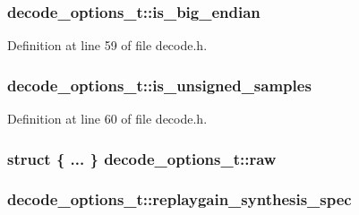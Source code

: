\subsubsection[{\texorpdfstring{is\+\_\+big\+\_\+endian}{is_big_endian}}]{ decode\+\_\+options\+\_\+t\+::is\+\_\+big\+\_\+endian}\hypertarget{structdecode__options__t_a7fc1291d097d6ccc9019b7ad43c47473}{}\label{structdecode__options__t_a7fc1291d097d6ccc9019b7ad43c47473}


Definition at line 59 of file decode.\+h.

\subsubsection[{\texorpdfstring{is\+\_\+unsigned\+\_\+samples}{is_unsigned_samples}}]{ decode\+\_\+options\+\_\+t\+::is\+\_\+unsigned\+\_\+samples}\hypertarget{structdecode__options__t_a6adc8c1b3f95ae05c70d2dc5653daad3}{}\label{structdecode__options__t_a6adc8c1b3f95ae05c70d2dc5653daad3}


Definition at line 60 of file decode.\+h.

\subsubsection[{\texorpdfstring{raw}{raw}}]{\setlength{\rightskip}{0pt plus 5cm}struct \{ ... \}   decode\+\_\+options\+\_\+t\+::raw}\hypertarget{structdecode__options__t_a3d53f9eb1062db2b1ddf7cba27d4b259}{}\label{structdecode__options__t_a3d53f9eb1062db2b1ddf7cba27d4b259}
\subsubsection[{\texorpdfstring{replaygain\+\_\+synthesis\+\_\+spec}{replaygain_synthesis_spec}}]{ decode\+\_\+options\+\_\+t\+::replaygain\+\_\+synthesis\+\_\+spec}\hypertarget{structdecode__options__t_a68835bb5d67061b449de74d96494aa57}{}\label{structdecode__options__t_a68835bb5d67061b449de74d96494aa57}



